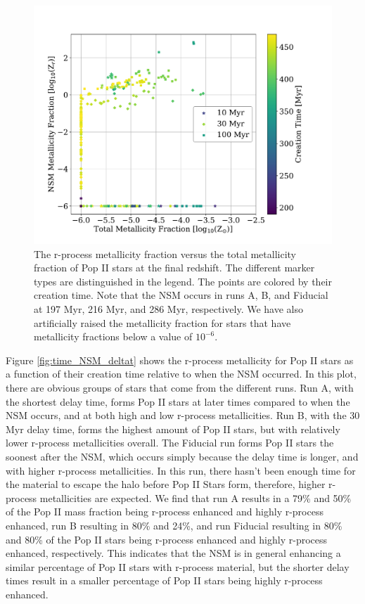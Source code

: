 \documentclass[fleqn,usenatbib]{mnras}
\begin{document}
\begin{figure} 
	\includegraphics[width=\columnwidth]{plots/time_NSM_tot.pdf}
	\caption[R-process metallicity fraction versus total metallicity fraction of Pop II stars in the delay time variation runs.]{The r-process metallicity fraction versus the total metallicity fraction of Pop II stars at the final redshift. The different marker types are distinguished in the legend. The points are colored by their creation time. Note that the NSM occurs in runs A, B, and Fiducial at 197 Myr, 216 Myr, and 286 Myr, respectively. We have also artificially raised the metallicity fraction for stars that have metallicity fractions below a value of $10^{-6}$.}
	\label{fig:time_NSM_p3}
\end{figure}

Figure \ref{fig:time_NSM_deltat} shows the r-process metallicity for Pop II stars as a function of their creation time relative to when the NSM occurred. In this plot, there are obvious groups of stars that come from the different runs. Run A, with the shortest delay time, forms Pop II stars at later times compared to when the NSM occurs, and at both high and low r-process metallicities. Run B, with the 30 Myr delay time, forms the highest amount of Pop II stars, but with relatively lower r-process metallicities overall. The Fiducial run forms Pop II stars the soonest after the NSM, which occurs simply because the delay time is longer, and with higher r-process metallicities. In this run, there hasn't been enough time for the material to escape the halo before Pop II Stars form, therefore, higher r-process metallicities are expected. We find that run A results in a 79\% and 50\% of the Pop II mass fraction being r-process enhanced and highly r-process enhanced, run B resulting in 80\% and 24\%, and run Fiducial resulting in 80\% and 80\% of the Pop II stars being r-process enhanced and highly r-process enhanced, respectively. This indicates that the NSM is in general enhancing a similar percentage of Pop II stars with r-process material, but the shorter delay times result in a smaller percentage of Pop II stars being highly r-process enhanced.
\end{document}
